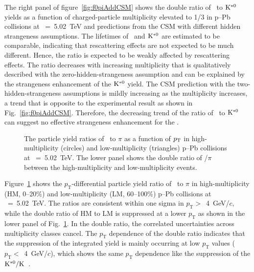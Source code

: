 The right panel of figure~\ref{fig:f0piAddCSM} shows the double ratio of \fzero~to $\rm{}K^{*0}$ yields as a function of charged-particle multiplicity elevated to 1/3 in p--Pb collisions at \snn~=~5.02~TeV and predictions from the CSM with different hidden strangeness assumptions. The lifetimes of \fzero~and $\rm{}K^{*0}$ are estimated to be comparable, indicating that rescattering effects are not expected to be much different. Hence, the ratio is expected to be weakly affected by rescattering effects. The ratio decreases with increasing multiplicity that is qualitatively described with the zero-hidden-strangeness assumption and can be explained by the strangeness enhancement of the $\rm{}K^{*0}$ yield. The CSM prediction with the two-hidden-strangeness assumptions is mildly increasing as the multiplicity increases, a trend that is opposite to the experimental result as shown in Fig.~\ref{fig:f0piAddCSM}. Therefore, the decreasing trend of the ratio of \fzero~to $\rm{}K^{*0}$ can suggest no effective strangeness enhancement for the \fzero.

\begin{figure}[!hbt]
	\centering
	\caption{ The particle yield ratios of \fzero~to $\pi$ as a function of $p_{\rm{T}}$ in high-multiplicity (circles) and low-multiplicity (triangles) p--Pb collisions at \snn~=~5.02~TeV. The lower panel shows the double ratio of \fzero/$\pi$ between the high-multiplicity and low-multiplicity events. }
	\label{fig:f0piPt}
\end{figure}

Figure~\ref{fig:f0piPt} shows the $p_{\mathrm{T}}$-differential particle yield ratio of \fzero~to $\pi$ in high-multiplicity (HM, 0--20\%) and low-multiplicity (LM, 60--100\%) p--Pb collisions at \snn~=~5.02~TeV. The ratios are consistent within one sigma in $p_{\mathrm{T}}>$~4~GeV/$c$, while the double ratio of HM to LM is suppressed at a lower $p_{\mathrm{T}}$ as shown in the lower panel of Fig.~\ref{fig:f0piPt}. In the double ratio, the correlated uncertainties across multiplicity classes cancel. The $p_{\mathrm{T}}$ dependence of the double ratio indicates that the suppression of the integrated yield is mainly occurring at low $p_{\mathrm{T}}$ values ($p_{\mathrm{T}}<$~4~GeV/$c$), which shows the same $p_{\mathrm{T}}$ dependence like the suppression of the $\rm{}K^{*0}/K$~\cite{ALICE:2019etb}.

